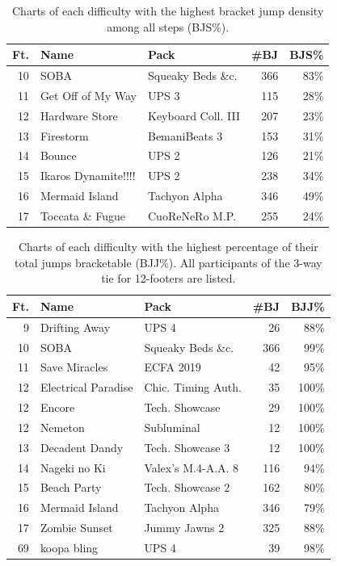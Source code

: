 \documentclass[10pt]{sigplanconf}
\begin{document}
\begin{table}[t]
	\begin{center}
		\small
	\begin{tabular}{r|l|l|r|r}
		\bf Ft. & \bf Name & \bf Pack & \bf \#BJ & \bf BJS\% \\
		\hline
		10 & SOBA			& Squeaky Beds \&c.	& 366 & 83\% \\
		11 & Get Off of My Way		& UPS 3			& 115 & 28\% \\
		12 & Hardware Store		& Keyboard Coll. III	& 207 & 23\% \\
		13 & Firestorm			& BemaniBeats 3		& 153 & 31\% \\
		14 & Bounce			& UPS 2			& 126 & 21\% \\
		15 & Ikaros Dynamite!!!!	& UPS 2			& 238 & 34\% \\
		16 & Mermaid Island		& Tachyon Alpha		& 346 & 49\% \\
		17 & Toccata \& Fugue		& CuoReNeRo M.P.	& 255 & 24\% \\
	\end{tabular}
	\end{center}
	\caption{Charts of each difficulty with the highest bracket jump density among all steps (BJS\%).}
	\label{tab:bjs}
\end{table}
\begin{table}[t]
	\begin{center}
		\small
	\begin{tabular}{r|l|l|r|r}
		\bf Ft. & \bf Name & \bf Pack & \bf \#BJ & \bf BJJ\% \\
		\hline
		 9 & Drifting Away		& UPS 4			&  26 &  88\% \\
		10 & SOBA			& Squeaky Beds \&c.	& 366 &  99\% \\
		11 & Save Miracles		& ECFA 2019		&  42 &  95\% \\
		12 & Electrical Paradise	& Chic. Timing Auth.	&  35 & 100\% \\
		12 & Encore			& Tech. Showcase	&  29 & 100\% \\
		12 & Nemeton			& Subluminal		&  12 & 100\% \\
		13 & Decadent Dandy		& Tech. Showcase 3	&  12 & 100\% \\
		14 & Nageki no Ki		& Valex's M.4-A.A. 8	& 116 &  94\% \\
		15 & Beach Party		& Tech. Showcase 2	& 162 &  80\% \\
		16 & Mermaid Island		& Tachyon Alpha		& 346 &  79\% \\
		17 & Zombie Sunset		& Jummy Jawns 2		& 325 &  88\% \\
		69 & koopa bling		& UPS 4			&  39 &  98\% \\
	\end{tabular}
	\end{center}
	\caption{Charts of each difficulty with the highest percentage of their total jumps bracketable (BJJ\%).
	All participants of the 3-way tie for 12-footers are listed.}
	\label{tab:bjj}
\end{table}
\end{document}
